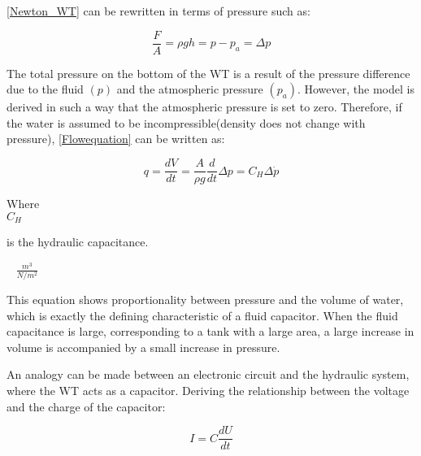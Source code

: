 \eqref{Newton_WT} can be rewritten in terms of pressure such as: 

\begin{equation}
  \frac{F}{A} = \rho g h = p - p_a = \Delta p
  \label{Pressuredifference}
\end{equation}

The total pressure on the bottom of the WT is a result of the pressure difference due to the fluid $(p)$ and the atmospheric pressure $(p_a)$. However, the model is derived in such a way that the atmospheric pressure is set to zero. Therefore, if the water is assumed to be incompressible(density does not change with pressure), \eqref{Flowequation} can be written as: 

\begin{equation}
q = \frac{dV}{dt} = \frac{A}{\rho g} \frac{d}{dt} \Delta p = C_H \Delta \dot{p}
  \label{FlowConservation}
\end{equation}

\begin{minipage}[t]{0.20\textwidth}
Where\\
\hspace*{8mm} $C_H$ 
\end{minipage}
\begin{minipage}[t]{0.68\textwidth}
\vspace*{2mm}
is the hydraulic capacitance.
\end{minipage}
\begin{minipage}[t]{0.10\textwidth}
\vspace*{2mm}
\textcolor{White}{te}$\unit{\frac{m^3}{N/m^2}}$
\end{minipage}

This equation shows proportionality between pressure and the volume of water, which is exactly the defining characteristic of a fluid capacitor. When the fluid capacitance is large, corresponding to a tank with a large area, a large increase in volume is accompanied by a small increase in pressure. 

An analogy can be made between an electronic circuit and the hydraulic system, where the WT acts as a capacitor.  Deriving the relationship between the voltage and the charge of the capacitor:

\begin{equation}
  I = C \frac{dU}{dt}
  \label{ElecCircuirt}
\end{equation}

